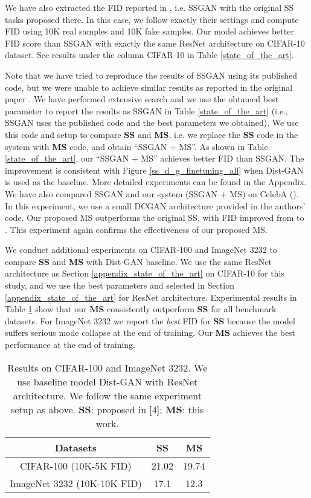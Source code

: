 \documentclass{article}
\begin{document}
We have also extracted the FID reported in \cite{chen-arxiv-2018}, i.e. SSGAN with the original SS tasks proposed there. In  this case, we follow exactly their settings and compute FID using 10K real samples and 10K fake samples. Our model achieves better FID score than SSGAN with exactly the same ResNet architecture on CIFAR-10 dataset.  See results under the column CIFAR-10 in Table \ref{state_of_the_art}.

Note that we have tried to reproduce the results of SSGAN 
using its published code, but we were unable to achieve similar results as reported in the original paper \cite{chen-arxiv-2018}. 
We have performed extensive search and we use the obtained best parameter to report the results as 
SSGAN in Table \ref{state_of_the_art} (i.e., SSGAN uses the published code and the best parameters we obtained). 
We use this code and setup to 
compare 
{\bf SS}  and {\bf MS}, i.e. we replace the {\bf SS} code in the system with {\bf MS} code, and obtain 
``SSGAN + MS''. As shown in Table \ref{state_of_the_art}, our ``SSGAN + MS'' achieves better FID than  SSGAN. 
The improvement is consistent with Figure \ref{ss_d_g_finetuning_all} when Dist-GAN is used as the baseline.
More detailed experiments can be found in the Appendix. 
We have also compared SSGAN and our system (SSGAN + MS) on CelebA (). In this experiment, we use a small DCGAN architecture provided in the authors' code. Our proposed MS outperforms the original SS, with FID improved  
from  to . This experiment  again confirms the effectiveness of our proposed MS.


We conduct additional experiments on CIFAR-100 and ImageNet 3232 to compare \textbf{SS} and \textbf{MS} with Dist-GAN baseline. We use the same ResNet architecture as Section \ref{appendix_state_of_the_art} on CIFAR-10 for this study, and we use the best parameters  and  selected in Section \ref{appendix_state_of_the_art} for ResNet architecture. Experimental results in Table  \ref{new_experiments_cifar100_imagenet} show that our \textbf{MS} consistently outperform \textbf{SS} for  all benchmark datasets. For ImageNet 3232 we report the \textit{best} FID for \textbf{SS} because the model suffers serious mode collapse at the end of training. Our \textbf{MS} achieves the best performance at the end of training.

\begin{table}
    \small
    \centering
    \caption{Results on CIFAR-100 and ImageNet 3232. We use baseline model Dist-GAN with ResNet architecture. We  follow the same experiment setup as above. {\bf SS}: proposed in [4]; {\bf MS}: this work.}
    \begin{tabular}{ c  c  c }
    \toprule
    \textbf{Datasets} & \textbf{SS} & \textbf{MS} \\
    \hline
    CIFAR-100 (10K-5K FID)                    & 21.02 & 19.74  \\
ImageNet 3232 (10K-10K FID)       & 17.1 & 12.3 \\
    \bottomrule
    \end{tabular}
    \label{new_experiments_cifar100_imagenet}
    \vspace{-0.4cm}
\end{table}
\end{document}
